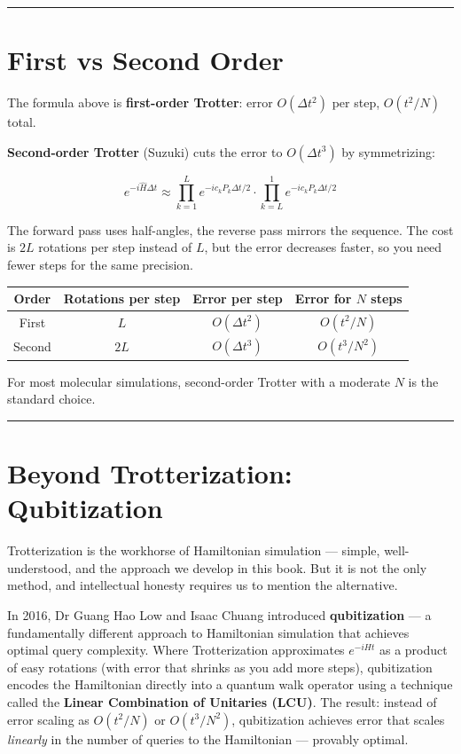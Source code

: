 \documentclass[
  11pt,
  oneside]{book}
\begin{document}
\begin{center}\rule{0.5\linewidth}{0.5pt}\end{center}

\section{First vs Second Order}\label{first-vs-second-order}

The formula above is \textbf{first-order Trotter}: error
\(O(\Delta t^2)\) per step, \(O(t^2/N)\) total.

\textbf{Second-order Trotter} (Suzuki) cuts the error to
\(O(\Delta t^3)\) by symmetrizing:

\[e^{-i\hat{H}\Delta t} \approx \prod_{k=1}^{L} e^{-ic_k P_k \Delta t/2} \cdot \prod_{k=L}^{1} e^{-ic_k P_k \Delta t/2}\]

The forward pass uses half-angles, the reverse pass mirrors the
sequence. The cost is \(2L\) rotations per step instead of \(L\), but
the error decreases faster, so you need fewer steps for the same
precision.

\begin{longtable}[]{@{}cccc@{}}
\toprule\noalign{}
Order & Rotations per step & Error per step & Error for \(N\) steps \\
\midrule\noalign{}
\endhead
\bottomrule\noalign{}
\endlastfoot
First & \(L\) & \(O(\Delta t^2)\) & \(O(t^2/N)\) \\
Second & \(2L\) & \(O(\Delta t^3)\) & \(O(t^3/N^2)\) \\
\end{longtable}

For most molecular simulations, second-order Trotter with a moderate
\(N\) is the standard choice.

\begin{center}\rule{0.5\linewidth}{0.5pt}\end{center}

\section{Beyond Trotterization:
Qubitization}\label{beyond-trotterization-qubitization}

Trotterization is the workhorse of Hamiltonian simulation --- simple,
well-understood, and the approach we develop in this book. But it is not
the only method, and intellectual honesty requires us to mention the
alternative.

In 2016, Dr Guang Hao Low and Isaac Chuang introduced
\textbf{qubitization} --- a fundamentally different approach to
Hamiltonian simulation that achieves optimal query complexity. Where
Trotterization approximates \(e^{-iHt}\) as a product of easy rotations
(with error that shrinks as you add more steps), qubitization encodes
the Hamiltonian directly into a quantum walk operator using a technique
called the \textbf{Linear Combination of Unitaries (LCU)}. The result:
instead of error scaling as \(O(t^2/N)\) or \(O(t^3/N^2)\), qubitization
achieves error that scales \emph{linearly} in the number of queries to
the Hamiltonian --- provably optimal.
\end{document}
